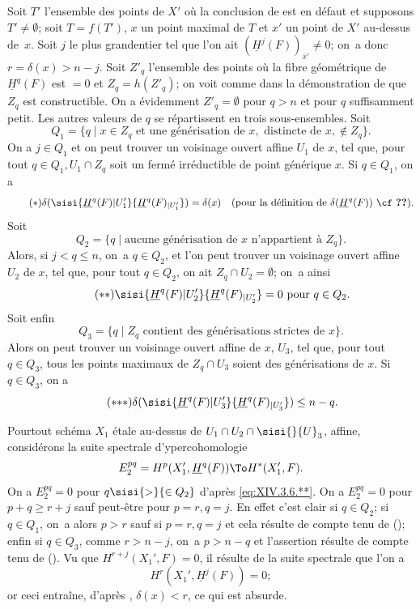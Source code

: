 Soit $T'$ l'ensemble des points de $X'$ o\`u la conclusion de  est en d\'efaut et supposons $T' \neq \emptyset$; soit $T=f(T')$, $x$ un point maximal de $T$ et $x'$ un point de $X'$ au-dessus de~$x$. Soit $j$ le plus grand\pageoriginale entier tel que l'on ait $(\underline{H}^j(F))_{\bar{x}'} \neq 0$; on~a donc $r=\delta(x)>n-j$. Soit $Z'_q$ l'ensemble des points o\`u la fibre g\'eom\'etrique de $\underline{H}^q(F)$ est $=0$ et $Z_q =h(Z'_q)$; on voit comme dans la d\'emonstration de  que $Z_q$ est constructible. On a \'evidemment $Z'_q=\emptyset$ pour $q>n$ et pour $q$ suffisamment petit. Les autres valeurs de $q$ se r\'epartissent en trois sous-ensembles. Soit
$$
Q_1=\{q\mid x\in Z_q\text{ et une g\'en\'erisation de }x, \text{ distincte de }x, \not\in Z_q\}.
$$
On a $j \in Q_1$ et on peut trouver un voisinage ouvert affine $U_1$ de $x$, tel que, pour tout $q \in Q_1, U_1 \cap Z_q$ soit un ferm\'e irr\'eductible de point g\'en\'erique $x$. Si $q \in Q_1$, on a
\begin{equation*} \label{eq:XIV.3.6.*} \tag{$*$} \delta(\sisi{\underline{H}^q(F){|U_1'}}{\underline{H}^q(F)_{|U_1'}})=\delta(x)\quad\text{(pour la d\'efinition de $\delta(\underline{H}^q(F))$ \cf \Ref{XIV.3.1})}.
\end{equation*}
Soit
$$
Q_2=\{q\mid\text{aucune g\'en\'erisation de $x$ n'appartient \`a }Z_q\}.
$$
Alors, si $j<q\leq n$, on~a $q\in Q_2$, et l'on peut trouver un voisinage ouvert affine $U_2$ de $x$, tel que, pour tout $q \in Q_2$, on ait $Z_q \cap U_2 = \emptyset$; on~a ainsi
\begin{equation*} \label{eq:XIV.3.6.**} \tag{$**$} \sisi{\underline{H}^q(F){|U'_2}}{\underline{H}^q(F)_{|U'_2}}=0\text{ pour }q\in Q_2.
\end{equation*}
Soit enfin
$$
Q_3= \{q\mid Z_q \text{ contient des g\'en\'erisations strictes de }x\}.
$$
Alors on peut trouver un voisinage ouvert affine de $x$, $U_3$, tel que, pour tout $q \in Q_3$, tous les points maximaux de $Z_q \cap U_3$ soient des g\'en\'erisations de $x$. Si $q \in Q_3$, on a
\begin{equation*} \label{eq:XIV.3.6.***} \tag{${*}{*}{*}$} \delta(\sisi{\underline{H}^q(F){|U'_3}}{\underline{H}^q(F)_{|U'_3}})\leq n-q.
\end{equation*}

Pour\pageoriginale tout sch\'ema $X_1$ \'etale au-dessus de $U_1 \cap U_2 \cap \sisi{{}}{U}_3$, affine, consid\'erons la suite spectrale d'ypercohomologie
$$
E^{pq}_2= H^p(X_1', \underline{H}^q(F)) \To H^*(X'_1, F).
$$
On a $E^{pq}_2=0$ pour $q\sisi{>}{\in Q_2}$ d'apr\`es \eqref{eq:XIV.3.6.**}. On a $E^{pq}_2=0$ pour $p+q \geq r+j$ sauf peut-\^etre pour $p=r, q=j$. En effet c'est clair si $q\in Q_2$; si $q\in Q_1$, on~a alors $p>r$ sauf si $p=r, q=j$ et cela r\'esulte de  compte tenu de (); enfin si $q\in Q_3$, comme $r>n-j$, on~a $p>n-q$ et l'assertion r\'esulte de  compte tenu de (). Vu que $H^{r+j}(X_1', F)=0$, il r\'esulte de la suite spectrale que l'on a
$$H^r(X_1', \underline{H}^j(F))=0;$$
or ceci entra\^ine, d'apr\`es , $\delta(x)<r$, ce qui est absurde.

